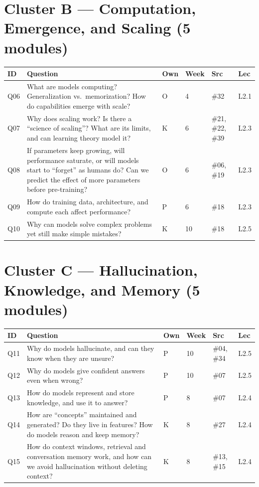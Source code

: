 \documentclass[11pt,letterpaper]{article}
\begin{document}
\section*{Cluster B --- Computation, Emergence, and Scaling (5 modules)}

\begin{longtable}{C{1.1cm} Q C{0.8cm} C{1.0cm} C{1.5cm} C{1.5cm}}
\toprule
\textbf{ID} & \textbf{Question} & \textbf{Own} & \textbf{Week} & \textbf{Src} & \textbf{Lec} \\
\midrule
Q06 & What are models computing? Generalization vs.\ memorization? How do capabilities emerge with scale? & O & 4 & \#32 & L2.1 \\
Q07 & Why does scaling work? Is there a ``science of scaling''? What are its limits, and can learning theory model it? & K & 6 & \#21, \#22, \#39 & L2.3 \\
Q08 & If parameters keep growing, will performance saturate, or will models start to ``forget'' as humans do? Can we predict the effect of more parameters before pre-training? & O & 6 & \#06, \#19 & L2.3 \\
Q09 & How do training data, architecture, and compute each affect performance? & P & 6 & \#18 & L2.3 \\
Q10 & Why can models solve complex problems yet still make simple mistakes? & K & 10 & \#18 & L2.5 \\
\bottomrule
\end{longtable}

\section*{Cluster C --- Hallucination, Knowledge, and Memory (5 modules)}

\begin{longtable}{C{1.1cm} Q C{0.8cm} C{1.0cm} C{1.5cm} C{1.5cm}}
\toprule
\textbf{ID} & \textbf{Question} & \textbf{Own} & \textbf{Week} & \textbf{Src} & \textbf{Lec} \\
\midrule
Q11 & Why do models hallucinate, and can they know when they are unsure? & P & 10 & \#04, \#34 & L2.5 \\
Q12 & Why do models give confident answers even when wrong? & P & 10 & \#07 & L2.5 \\
Q13 & How do models represent and store knowledge, and use it to answer? & P & 8 & \#07 & L2.4 \\
Q14 & How are ``concepts'' maintained and generated? Do they live in features? How do models reason and keep memory? & K & 8 & \#27 & L2.4 \\
Q15 & How do context windows, retrieval and conversation memory work, and how can we avoid hallucination without deleting context? & K & 8 & \#13, \#15 & L2.4 \\
\bottomrule
\end{longtable}
\end{document}
